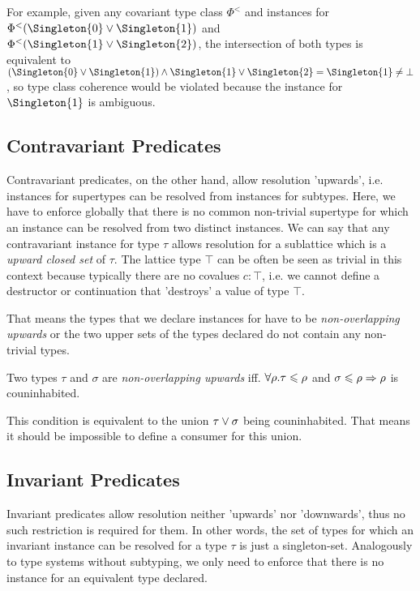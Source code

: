 For example, given any covariant type class $\Phi^<$ and instances for $\Phi^<(\Singleton{0} \join \Singleton{1})$ and $\Phi^<(\Singleton{1} \join \Singleton{2})$,
the intersection of both types is equivalent to $(\Singleton{0} \join \Singleton{1}) \meet \Singleton{1} \join \Singleton{2} = \Singleton{1} \neq \bot$, so type class coherence would be violated because the instance for $\Singleton{1}$ is ambiguous.

\subsection{Contravariant Predicates}

Contravariant predicates, on the other hand, allow resolution 'upwards', i.e. instances for supertypes can be resolved from instances for subtypes.
Here, we have to enforce globally that there is no common non-trivial supertype for which an instance can be resolved from two distinct instances.
We can say that any contravariant instance for type $\tau$ allows resolution for a sublattice which is a \emph{upward closed set} of $\tau$.
The lattice type $\top$ can be often be seen as trivial in this context because typically there are no covalues $c : \top$, i.e. we cannot define a destructor or continuation that 'destroys' a value of type $\top$.

That means the types that we declare instances for have to be \emph{non-overlapping upwards} or the two upper sets of the types declared do not contain any non-trivial types.

\begin{definition}
  Two types $\tau$ and $\sigma$ are \emph{non-overlapping upwards} iff. $\forall\rho. \tau \leqslant \rho$ and $\sigma \leqslant \rho \Rightarrow \rho$ is couninhabited.
\end{definition}

This condition is equivalent to the union $\tau \vee \sigma$ being couninhabited.
That means it should be impossible to define a consumer for this union. %

\subsection{Invariant Predicates}

Invariant predicates allow resolution neither 'upwards' nor 'downwards', thus no such restriction is required for them.
In other words, the set of types for which an invariant instance can be resolved for a type $\tau$ is just a singleton-set.
Analogously to type systems without subtyping, we only need to enforce that there is no instance for an equivalent type declared.



